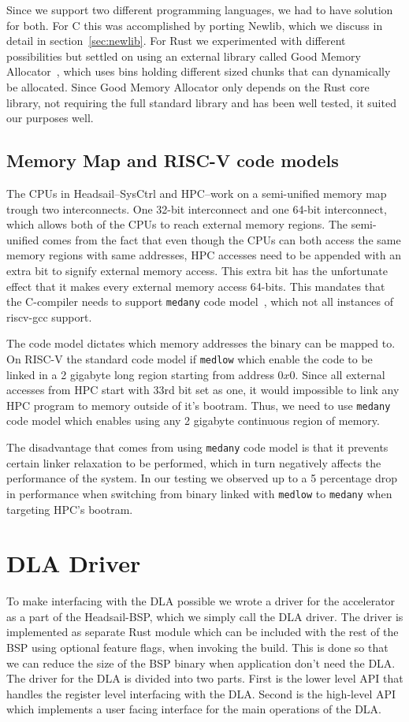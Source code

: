 \documentclass[12pt,a4paper,english
]{tunithesis}
\begin{document}
Since we support two different programming languages, we had to have solution for both. For C this was accomplished by porting Newlib, which we discuss in detail in section~\ref{sec:newlib}. For Rust we experimented with different possibilities but settled on using an external library called Good Memory Allocator~\cite{galloc_memory_allocator}, which uses bins holding different sized chunks that can dynamically be allocated. Since Good Memory Allocator only depends on the Rust core library, not requiring the full standard library and has been well tested, it suited our purposes well.

\subsection{Memory Map and RISC-V code models}
The CPUs in Headsail--SysCtrl and HPC--work on a semi-unified memory map trough two interconnects. One 32-bit interconnect and one 64-bit interconnect, which allows both of the CPUs to reach external memory regions. The semi-unified comes from the fact that even though the CPUs can both access the same memory regions with same addresses, HPC accesses need to be appended with an extra bit to signify external memory access. This extra bit has the unfortunate effect that it makes every external memory access 64-bits. This mandates that the C-compiler needs to support \texttt{medany} code model~\cite{sifive_riscv_code_models}, which not all instances of riscv-gcc support.

The code model dictates which memory addresses the binary can be mapped to. On RISC-V the standard code model if \texttt{medlow} which enable the code to be linked in a 2 gigabyte long region starting from address $0x0$. Since all external accesses from HPC start with 33rd bit set as one, it would impossible to link any HPC program to memory outside of it's bootram. Thus, we need to use \texttt{medany} code model which enables using any 2 gigabyte continuous region of memory.

The disadvantage that comes from using \texttt{medany} code model is that it prevents certain linker relaxation to be performed, which in turn negatively affects the performance of the system. In our testing we observed up to a 5 percentage drop in performance when switching from binary linked with \texttt{medlow} to \texttt{medany} when targeting HPC's bootram.

\section{DLA Driver}
To make interfacing with the DLA possible we wrote a driver for the accelerator as a part of the Headsail-BSP, which we simply call the DLA driver.
The driver is implemented as separate Rust module which can be included with the rest of the BSP using optional feature flags, when invoking the build. This is done so that we can reduce the size of the BSP binary when application don't need the DLA. The driver for the DLA is divided into two parts. First is the lower level API that handles the register level interfacing with the DLA. Second is the high-level API which implements a user facing interface for the main operations of the DLA.
\end{document}

